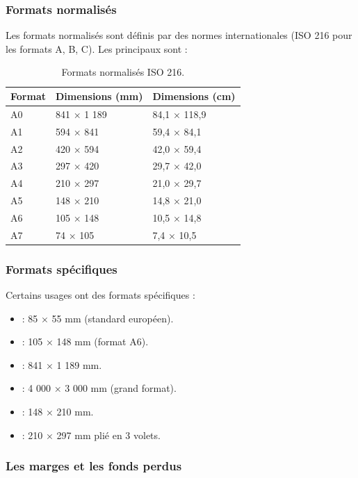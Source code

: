 \subsubsection{Formats normalisés}

Les formats normalisés sont définis par des normes internationales (ISO 216 pour les formats A, B, C). Les principaux sont :

\begin{table}[h!]
\centering
\begin{tabular}{@{}lll@{}}
\toprule
\textbf{Format} & \textbf{Dimensions (mm)} & \textbf{Dimensions (cm)} \\
\midrule
A0 & 841 × 1 189 & 84,1 × 118,9 \\
A1 & 594 × 841 & 59,4 × 84,1 \\
A2 & 420 × 594 & 42,0 × 59,4 \\
A3 & 297 × 420 & 29,7 × 42,0 \\
A4 & 210 × 297 & 21,0 × 29,7 \\
A5 & 148 × 210 & 14,8 × 21,0 \\
A6 & 105 × 148 & 10,5 × 14,8 \\
A7 & 74 × 105 & 7,4 × 10,5 \\
\bottomrule
\end{tabular}
\caption{Formats normalisés ISO 216.}
\end{table}

\subsubsection{Formats spécifiques}

Certains usages ont des formats spécifiques :

\begin{itemize}
    \item {} : 85 × 55 mm (standard européen).
    \item {} : 105 × 148 mm (format A6).
    \item {} : 841 × 1 189 mm.
    \item {} : 4 000 × 3 000 mm (grand format).
    \item {} : 148 × 210 mm.
    \item {} : 210 × 297 mm plié en 3 volets.
\end{itemize}

\subsubsection{Les marges et les fonds perdus}

